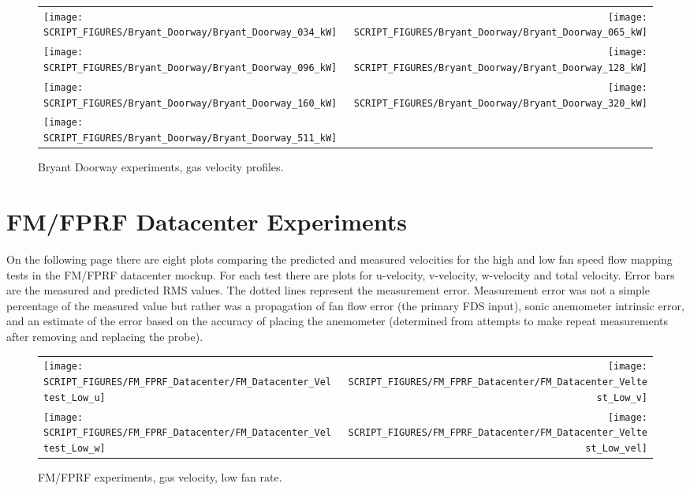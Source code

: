\newpage

\begin{figure}[p]
\begin{tabular*}{\textwidth}{l@{\extracolsep{\fill}}r}
\texttt{[image: SCRIPT\_FIGURES/Bryant\_Doorway/Bryant\_Doorway\_034\_kW]} &
\texttt{[image: SCRIPT\_FIGURES/Bryant\_Doorway/Bryant\_Doorway\_065\_kW]} \\
\texttt{[image: SCRIPT\_FIGURES/Bryant\_Doorway/Bryant\_Doorway\_096\_kW]} &
\texttt{[image: SCRIPT\_FIGURES/Bryant\_Doorway/Bryant\_Doorway\_128\_kW]} \\
\texttt{[image: SCRIPT\_FIGURES/Bryant\_Doorway/Bryant\_Doorway\_160\_kW]} &
\texttt{[image: SCRIPT\_FIGURES/Bryant\_Doorway/Bryant\_Doorway\_320\_kW]} \\
\texttt{[image: SCRIPT\_FIGURES/Bryant\_Doorway/Bryant\_Doorway\_511\_kW]} &
\end{tabular*}
\caption[Bryant Doorway experiments, gas velocity profiles]{Bryant Doorway experiments, gas velocity profiles.}
\label{Bryant_Doorway}
\end{figure}


\clearpage

\section{FM/FPRF Datacenter Experiments}

On the following page there are eight plots comparing the predicted and measured velocities for the high and low fan speed flow mapping tests in the FM/FPRF datacenter mockup. For each test there are plots for u-velocity, v-velocity, w-velocity and total velocity. Error bars are the measured and predicted RMS values. The dotted lines represent the measurement error. Measurement error was not a simple percentage of the measured value but rather was a propagation of fan flow error (the primary FDS input), sonic anemometer intrinsic error, and an estimate of the error based on the accuracy of placing the anemometer (determined from attempts to make repeat measurements after removing and replacing the probe).

\begin{figure}[ht]
\begin{tabular*}{\textwidth}{l@{\extracolsep{\fill}}r}
\texttt{[image: SCRIPT\_FIGURES/FM\_FPRF\_Datacenter/FM\_Datacenter\_Veltest\_Low\_u]} &
\texttt{[image: SCRIPT\_FIGURES/FM\_FPRF\_Datacenter/FM\_Datacenter\_Veltest\_Low\_v]} \\
\texttt{[image: SCRIPT\_FIGURES/FM\_FPRF\_Datacenter/FM\_Datacenter\_Veltest\_Low\_w]} &
\texttt{[image: SCRIPT\_FIGURES/FM\_FPRF\_Datacenter/FM\_Datacenter\_Veltest\_Low\_vel]}
\end{tabular*}
\caption[FM/FPRF experiments, gas velocity, low fan rate]{FM/FPRF experiments, gas velocity, low fan rate.}
\label{FM_Datacenter_Flow_Mapping_1}
\end{figure}

